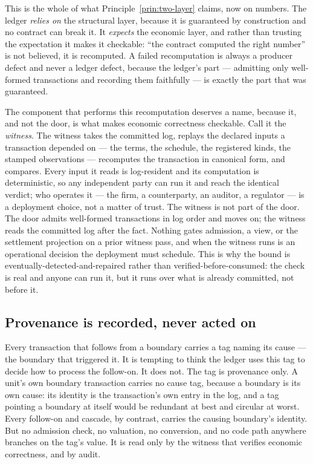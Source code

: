 This is the whole of what Principle~\ref{prin:two-layer} claims, now on numbers.
The ledger \emph{relies on} the structural layer, because it is guaranteed by
construction and no contract can break it. It \emph{expects} the economic layer,
and rather than trusting the expectation it makes it checkable: ``the contract
computed the right number'' is not believed, it is recomputed. A failed
recomputation is always a producer defect and never a ledger defect, because the
ledger's part --- admitting only well-formed transactions and recording them
faithfully --- is exactly the part that was guaranteed.

The component that performs this recomputation deserves a name, because it, and not
the door, is what makes economic correctness checkable. Call it the \emph{witness}.
The witness takes the committed log, replays the declared inputs a transaction
depended on --- the terms, the schedule, the registered kinds, the stamped
observations --- recomputes the transaction in canonical form, and compares. Every
input it reads is log-resident and its computation is deterministic, so any
independent party can run it and reach the identical verdict; who operates it --- the
firm, a counterparty, an auditor, a regulator --- is a deployment choice, not a
matter of trust. The witness is not part of the door. The door admits well-formed
transactions in log order and moves on; the witness reads the committed log after the
fact. Nothing gates admission, a view, or the settlement projection on a prior
witness pass, and when the witness runs is an operational decision the deployment
must schedule. This is why the
bound is eventually-detected-and-repaired rather than verified-before-consumed: the
check is real and anyone can run it, but it runs over what is already committed, not
before it.

\subsection{Provenance is recorded, never acted on}

Every transaction that follows from a boundary carries a tag naming its cause ---
the boundary that triggered it. It is tempting to think the ledger uses this tag to
decide how to process the follow-on. It does not. The tag is provenance only. A
unit's own boundary transaction carries no cause tag, because a boundary is its own
cause: its identity is the transaction's own entry in the log, and a tag pointing a
boundary at itself would be redundant at best and circular at worst. Every follow-on
and cascade, by contrast, carries the causing boundary's identity. But no admission
check, no valuation, no conversion, and no code path anywhere branches on the tag's
value. It is read only by the witness that verifies economic correctness, and by
audit.

